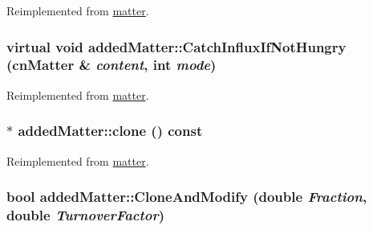 Reimplemented from \hyperlink{classmatter_abbc0846a0f37653351fbae149fbb91ce}{matter}.\hypertarget{classadded_matter_a23ebccf4a6eeb768a053a6c8c8190111}{
\subsubsection[{CatchInfluxIfNotHungry}]{\setlength{\rightskip}{0pt plus 5cm}virtual void addedMatter::CatchInfluxIfNotHungry ({\bf cnMatter} \& {\em content}, \/  int {\em mode})}}
\label{classadded_matter_a23ebccf4a6eeb768a053a6c8c8190111}


Reimplemented from \hyperlink{classmatter_af6764fccc5304bb9832879c40e7c7cba}{matter}.\hypertarget{classadded_matter_ad211e0c8e46f87b030a5101560f0c6a0}{
\subsubsection[{clone}]{ $\ast$ addedMatter::clone () const}}
\label{classadded_matter_ad211e0c8e46f87b030a5101560f0c6a0}


Reimplemented from \hyperlink{classmatter_afca594a86c75c8f40856bc5c8711266c}{matter}.\hypertarget{classadded_matter_a8032c019960cff02dc5cb38ef2c2614e}{
\subsubsection[{CloneAndModify}]{\setlength{\rightskip}{0pt plus 5cm}bool addedMatter::CloneAndModify (double {\em Fraction}, \/  double {\em TurnoverFactor})}}
\label{classadded_matter_a8032c019960cff02dc5cb38ef2c2614e}


